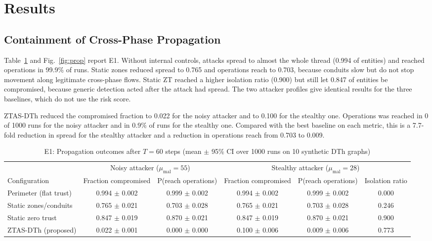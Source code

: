 \documentclass[journal]{IEEEtran}
\newcommand{\ztas}{ZTAS-DTh}
\begin{document}
\section{Results}
\label{sec:results}
\subsection{Containment of Cross-Phase Propagation}
Table~\ref{tab:main} and Fig.~\ref{fig:prop} report E1. Without internal controls, attacks spread to almost the whole thread (0.994 of entities) and reached operations in 99.9\% of runs. Static zones reduced spread to 0.765 and operations reach to 0.703, because conduits slow but do not stop movement along legitimate cross-phase flows. Static ZT reached a higher isolation ratio (0.900) but still let 0.847 of entities be compromised, because generic detection acted after the attack had spread. The two attacker profiles give identical results for the three baselines, which do not use the risk score.

\ztas{} reduced the compromised fraction to 0.022 for the noisy attacker and to 0.100 for the stealthy one. Operations was reached in 0 of 1000 runs for the noisy attacker and in 0.9\% of runs for the stealthy one. Compared with the best baseline on each metric, this is a 7.7-fold reduction in spread for the stealthy attacker and a reduction in operations reach from 0.703 to 0.009.

\begin{table}[!t]
\centering
\caption{E1: Propagation outcomes after $T=60$ steps (mean $\pm$ 95\% CI over 1000 runs on 10 synthetic DTh graphs)}
\label{tab:main}
\footnotesize
\begin{tabular}{@{}lccccc@{}}
\toprule
 & \multicolumn{2}{c}{Noisy attacker ($\mu_{\mathrm{mal}}=55$)} & \multicolumn{3}{c}{Stealthy attacker ($\mu_{\mathrm{mal}}=28$)} \\
\cmidrule(lr){2-3}\cmidrule(lr){4-6}
Configuration & Fraction compromised & P(reach operations) & Fraction compromised & P(reach operations) & Isolation ratio \\
\midrule
Perimeter (flat trust) & 0.994 $\pm$ 0.002 & 0.999 $\pm$ 0.002 & 0.994 $\pm$ 0.002 & 0.999 $\pm$ 0.002 & 0.000 \\
Static zones/conduits & 0.765 $\pm$ 0.021 & 0.703 $\pm$ 0.028 & 0.765 $\pm$ 0.021 & 0.703 $\pm$ 0.028 & 0.246 \\
Static zero trust & 0.847 $\pm$ 0.019 & 0.870 $\pm$ 0.021 & 0.847 $\pm$ 0.019 & 0.870 $\pm$ 0.021 & 0.900 \\
ZTAS-DTh (proposed) & 0.022 $\pm$ 0.001 & 0.000 $\pm$ 0.000 & 0.100 $\pm$ 0.006 & 0.009 $\pm$ 0.006 & 0.773 \\
\bottomrule
\end{tabular}
\end{table}
\end{document}
